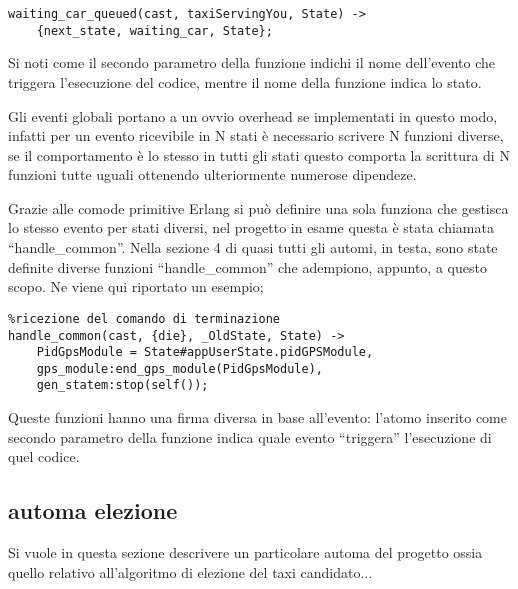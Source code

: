 \begin{lstlisting}
waiting_car_queued(cast, taxiServingYou, State) ->
	{next_state, waiting_car, State};
\end{lstlisting}

Si noti come il secondo parametro della funzione indichi il nome dell'evento che triggera l'esecuzione del codice, mentre il nome della funzione indica lo stato.

Gli eventi globali portano a un ovvio overhead se implementati in questo modo, infatti per un evento ricevibile in N stati è necessario scrivere N funzioni diverse, se il comportamento è lo stesso in tutti gli stati questo comporta la scrittura di N funzioni tutte uguali ottenendo ulteriormente numerose dipendeze.

Grazie alle comode primitive Erlang si può definire una sola funziona che gestisca lo stesso evento per stati diversi, nel progetto in esame questa è stata chiamata ``handle\_common''. Nella sezione 4 di quasi tutti gli automi, in testa, sono state definite diverse funzioni ``handle\_common'' che adempiono, appunto, a questo scopo. Ne viene qui riportato un esempio;

\begin{lstlisting}
%ricezione del comando di terminazione
handle_common(cast, {die}, _OldState, State) ->
	PidGpsModule = State#appUserState.pidGPSModule,
	gps_module:end_gps_module(PidGpsModule),
	gen_statem:stop(self());
\end{lstlisting}

Queste funzioni hanno una firma diversa in base all'evento: l'atomo inserito come secondo parametro della funzione indica quale evento ``triggera'' l'esecuzione di quel codice.

\subsection{automa elezione}

Si vuole in questa sezione descrivere un particolare automa del progetto ossia quello relativo all'algoritmo di elezione del taxi candidato...
